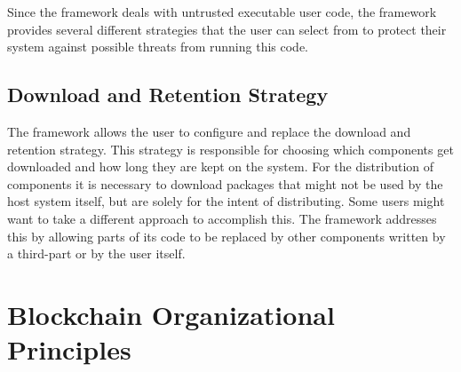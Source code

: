 Since the framework deals with untrusted executable user code, the framework provides several different strategies that the user can select from to protect their system against possible threats from running this code.

\subsection{Download and Retention Strategy}

The framework allows the user to configure and replace the download and retention strategy. This strategy is responsible for choosing which components get downloaded and how long they are kept on the system. For the distribution of components it is necessary to download packages that might not be used by the host system itself, but are solely for the intent of distributing. Some users might want to take a different approach to accomplish this. The framework addresses this by allowing parts of its code to be replaced by other components written by a third-part or by the user itself.

\section{Blockchain Organizational Principles}

